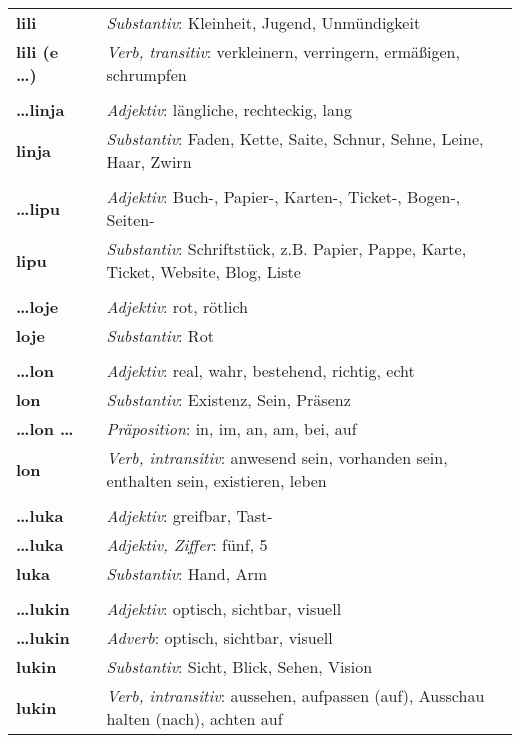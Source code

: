 \begin{supertabular}{p{2,5cm}|ll}
\textbf{lili} && \textit{Substantiv}: Kleinheit, Jugend, Unmündigkeit \\ 
\textbf{lili (e \dots)} && \textit{Verb, transitiv}: verkleinern, verringern, ermäßigen, schrumpfen\\ 
 && \\ %
\textbf{\dots linja} && \textit{Adjektiv}: längliche, rechteckig, lang \\ 
\textbf{linja} && \textit{Substantiv}: Faden, Kette, Saite, Schnur, Sehne, Leine, Haar, Zwirn \\ 
 && \\ %
\textbf{\dots lipu} && \textit{Adjektiv}: Buch-, Papier-, Karten-, Ticket-, Bogen-, Seiten- \\ 
\textbf{lipu} && \textit{Substantiv}: Schriftstück, z.B. Papier, Pappe, Karte, Ticket, Website, Blog, Liste \\ 
 && \\ %
\textbf{\dots loje} && \textit{Adjektiv}: rot, rötlich \\ 
\textbf{loje} && \textit{Substantiv}: Rot \\ 
 && \\ %
\textbf{\dots lon} && \textit{Adjektiv}: real, wahr, bestehend, richtig, echt \\ 
\textbf{lon} && \textit{Substantiv}: Existenz, Sein, Präsenz \\ 
\textbf{\dots lon \dots} && \textit{Präposition}: in, im, an, am, bei, auf \\ 
\textbf{lon} && \textit{Verb, intransitiv}: anwesend sein, vorhanden sein, enthalten sein, existieren, leben \\ 
 && \\ %
\textbf{\dots luka} && \textit{Adjektiv}: greifbar, Tast- \\ 
\textbf{\dots luka} && \textit{Adjektiv, Ziffer}: fünf, 5 \\ 
\textbf{luka} && \textit{Substantiv}: Hand, Arm \\ 
 && \\ %
\textbf{\dots lukin} && \textit{Adjektiv}: optisch, sichtbar, visuell \\ 
\textbf{\dots lukin} && \textit{Adverb}: optisch, sichtbar, visuell \\ 
\textbf{lukin} && \textit{Substantiv}: Sicht, Blick, Sehen, Vision \\ 
\textbf{lukin} && \textit{Verb, intransitiv}: aussehen, aufpassen (auf), Ausschau halten (nach), achten auf \\ 

\end{supertabular}
